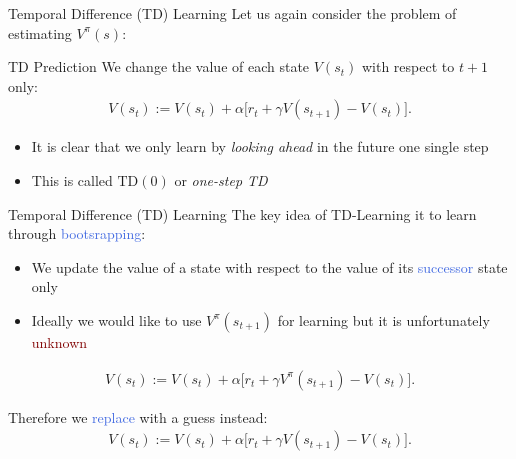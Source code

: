 \documentclass{beamer}
\begin{document}
\begin{frame}{Temporal Difference (TD) Learning}
	Let us again consider the problem of estimating $V^{\pi}(s)$:
	\begin{block}{TD Prediction}
		We change the value of each state $V(s_t)$ with respect to $t+1$ only:
		\begin{align*}
			V(s_t):= V(s_t) + \alpha \big[r_t + \gamma V(s_{t+1}) - V(s_t)\big].
		\end{align*}
	\end{block}
	
	\begin{itemize}
		\item It is clear that we only learn by \textit{looking ahead} in the future one single step
		\item This is called $\text{TD}(0)$ or \textit{one-step TD}
	\end{itemize}

\end{frame}


\begin{frame}{Temporal Difference (TD) Learning}
	The key idea of TD-Learning it to learn through \textcolor{RoyalBlue}{bootsrapping}:
	\begin{itemize}
		\item We update the value of a state with respect to the value of its \textcolor{RoyalBlue}{successor} state only
		\item Ideally we would like to use $V^{\pi}(s_{t+1})$ for learning but it is unfortunately \textcolor{Maroon}{unknown}
	\end{itemize}
	
	\begin{align*}
		V(s_t):= V(s_t) + \alpha \big[r_t + \gamma V^{\pi}(s_{t+1}) - V(s_t)\big].
	\end{align*}


	Therefore we \textcolor{RoyalBlue}{replace} with a guess instead:
	\begin{align*}
		V(s_t):= V(s_t) + \alpha \big[r_t + \gamma V(s_{t+1}) - V(s_t)\big].
	\end{align*}
	
\end{frame}
\end{document}
